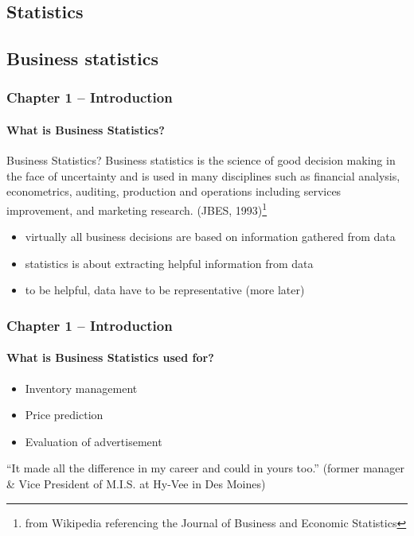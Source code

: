 \documentclass[handout]{beamer}
\begin{document}
\subsection{Statistics}



\subsection{Business statistics}
\begin{frame}
\frametitle{Chapter 1 -- Introduction}
\framesubtitle{What is Business Statistics?}

\begin{definition}{Business Statistics?}
Business statistics is the science of good decision making in the face of 
uncertainty and is used in many disciplines such as financial analysis, 
econometrics, auditing, production and operations including services 
improvement, and marketing research. 
(JBES, 1993)\footnote{from Wikipedia referencing the Journal of Business and Economic Statistics}
\end{definition}

\vspace{0.1in} \pause

\begin{itemize}[<+->]
\item virtually all business decisions are based on information gathered from data
\item statistics is about extracting helpful information from data
\item to be helpful, data have to be representative (more later)
\end{itemize}
\end{frame}




\begin{frame}
\frametitle{Chapter 1 -- Introduction}
\framesubtitle{What is Business Statistics used for?}

\begin{itemize}[<+->]
\item Inventory management
\item Price prediction
\item Evaluation of advertisement
\end{itemize}

\vspace{0.1in} \pause


``It made all the difference in my career and could in yours too.'' 
(former manager \& Vice President of M.I.S. at Hy-Vee in Des Moines)

\end{frame}
\end{document}
